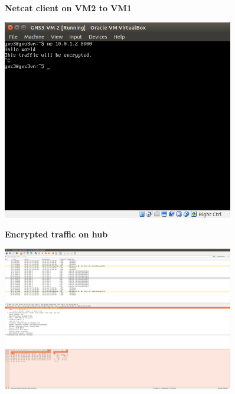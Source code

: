 \documentclass[a4paper]{scrreprt}
\begin{document}
\begin{figure}[H]
    \centering
    \textbf{Netcat client on VM2 to VM1}\par\medskip
    \includegraphics[width=0.9\textwidth]{resources/nc_vm2_to_vm1.png}
\end{figure}

\begin{figure}[H]
    \centering
    \textbf{Encrypted traffic on hub}\par\medskip
    \includegraphics[width=0.9\textwidth]{resources/wireshark_hub1_to_r2.png}
\end{figure}
\end{document}

